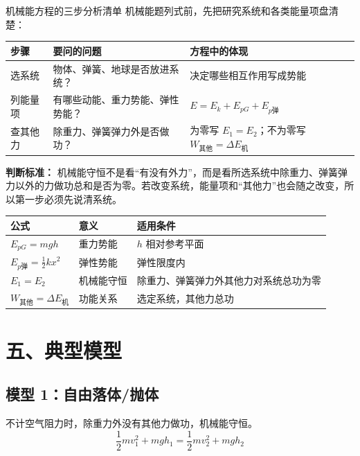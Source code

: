 \begin{learningbox}{机械能方程的三步分析清单}
机械能题列式前，先把研究系统和各类能量项盘清楚：

\begin{center}
\begin{tabular}{p{}p{}p{}}
\toprule
步骤 & 要问的问题 & 方程中的体现 \\
\midrule
选系统 & 物体、弹簧、地球是否放进系统？ & 决定哪些相互作用写成势能 \\
列能量项 & 有哪些动能、重力势能、弹性势能？ & $E=E_k+E_{pG}+E_{p\text{弹}}$ \\
查其他力 & 除重力、弹簧弹力外是否做功？ & 为零写 $E_1=E_2$；不为零写 $W_{\text{其他}}=\Delta E_{\text{机}}$ \\
\bottomrule
\end{tabular}
\end{center}

\textbf{判断标准：} 机械能守恒不是看“有没有外力”，而是看所选系统中除重力、弹簧弹力以外的力做功总和是否为零。若改变系统，能量项和“其他力”也会随之改变，所以第一步必须先说清系统。
\end{learningbox}

\begin{center}
\begin{tabular}{lll}
\toprule
公式 & 意义 & 适用条件 \\
\midrule
$E_{pG} = mgh$ & 重力势能 & $h$ 相对参考平面 \\
$E_{p\text{弹}} = \frac12 kx^2$ & 弹性势能 & 弹性限度内 \\
$E_1 = E_2$ & 机械能守恒 & 除重力、弹簧弹力外其他力对系统总功为零 \\
$W_{\text{其他}} = \Delta E_{\text{机}}$ & 功能关系 & 选定系统，其他力总功 \\
\bottomrule
\end{tabular}
\end{center}

\section*{五、典型模型}

\subsection*{模型 1：自由落体/抛体}

不计空气阻力时，除重力外没有其他力做功，机械能守恒。
\[
\frac12 mv_1^2 + mgh_1 = \frac12 mv_2^2 + mgh_2
\]

